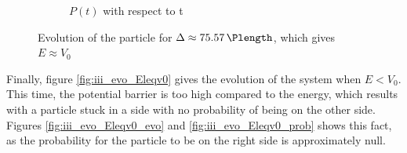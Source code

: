 \documentclass[a4paper,12pt,twoside]{article}
\begin{document}
\begin{figure}[h]
\begin{subfigure}[t]{0.45\textwidth}
        \caption{$P(t)$ with respect to t}
        \label{fig:iii_evo_Eeqv0_prob}
      \end{subfigure}
      \caption{Evolution of the particle for $\Delta \approx \SI{75.57}{\Plength}$, which gives $E \approx V_0$}
      \label{fig:iii_evo_Eeqv0}
    \end{figure}

    Finally, figure \ref{fig:iii_evo_Eleqv0} gives the evolution of the system when $E<V_0$.
    This time, the potential barrier is too high compared to the energy, which results with a particle stuck in a side with no probability of being on the other side.
    Figures \ref{fig:iii_evo_Eleqv0_evo} and \ref{fig:iii_evo_Eleqv0_prob} shows this fact, as the probability for the particle to be on the right side is approximately null.\\
\end{document}
